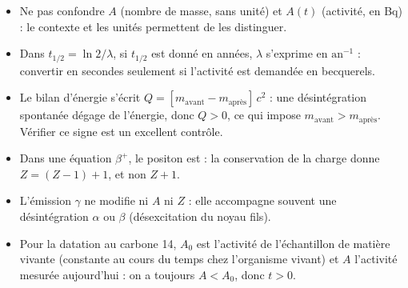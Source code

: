 \documentclass[11pt]{article}
\begin{document}
\begin{attention}
\begin{itemize}
  \item Ne pas confondre $A$ (nombre de masse, sans unité) et $A(t)$ (activité, en Bq) : le contexte et les unités permettent de les distinguer.
  \item Dans $t_{1/2} = \ln 2 / \lambda$, si $t_{1/2}$ est donné en années, $\lambda$ s'exprime en $\mathrm{an}^{-1}$ : convertir en secondes seulement si l'activité est demandée en becquerels.
  \item Le bilan d'énergie s'écrit $Q = [m_{\text{avant}} - m_{\text{après}}]\,c^2$ : une désintégration spontanée dégage de l'énergie, donc $Q > 0$, ce qui impose $m_{\text{avant}} > m_{\text{après}}$. Vérifier ce signe est un excellent contrôle.
  \item Dans une équation $\beta^+$, le positon est  : la conservation de la charge donne $Z = (Z-1) + 1$, et non $Z+1$.
  \item L'émission $\gamma$ ne modifie ni $A$ ni $Z$ : elle accompagne souvent une désintégration $\alpha$ ou $\beta$ (désexcitation du noyau fils).
  \item Pour la datation au carbone 14, $A_0$ est l'activité de l'échantillon de matière vivante (constante au cours du temps chez l'organisme vivant) et $A$ l'activité mesurée aujourd'hui : on a toujours $A < A_0$, donc $t > 0$.
\end{itemize}
\end{attention}
\end{document}
